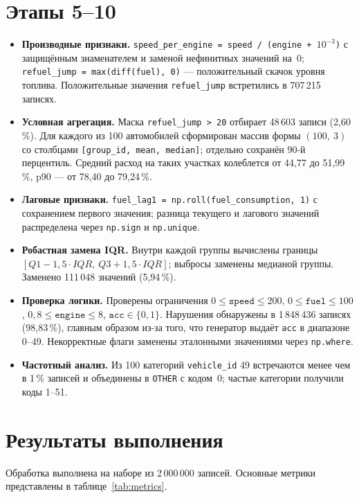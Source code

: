 \documentclass[oneside,a4paper,14pt]{extarticle}
\begin{document}
\section*{Этапы 5--10}
\begin{itemize}[leftmargin=*]
	\item \textbf{Производные признаки.} \texttt{speed\_per\_engine = speed / (engine + $10^{-3}$)} с защищённым знаменателем и заменой нефинитных значений на~0; \texttt{refuel\_jump = max(diff(fuel), 0)} --- положительный скачок уровня топлива. Положительные значения \texttt{refuel\_jump} встретились в 707\,215 записях.
	\item \textbf{Условная агрегация.} Маска \texttt{refuel\_jump > 20} отбирает 48\,603 записи (2,60\,\%). Для каждого из 100 автомобилей сформирован массив формы $(100,\ 3)$ со столбцами \texttt{[group\_id, mean, median]}; отдельно сохранён 90-й перцентиль. Средний расход на таких участках колеблется от 44,77 до 51,99\,\%, p90 --- от 78,40 до 79,24\,\%.
	\item \textbf{Лаговые признаки.} \texttt{fuel\_lag1 = np.roll(fuel\_consumption, 1)} с сохранением первого значения; разница текущего и лагового значений распределена через \texttt{np.sign} и \texttt{np.unique}.
	\item \textbf{Робастная замена IQR.} Внутри каждой группы вычислены границы $[Q1 - 1{,}5 \cdot IQR,\ Q3 + 1{,}5 \cdot IQR]$; выбросы заменены медианой группы. Заменено 111\,048 значений (5,94\,\%).
	\item \textbf{Проверка логики.} Проверены ограничения $0 \le \texttt{speed} \le 200$, $0 \le \texttt{fuel} \le 100$, $0{,}8 \le \texttt{engine} \le 8$, $\texttt{acc} \in \{0,1\}$. Нарушения обнаружены в 1\,848\,436 записях (98,83\,\%), главным образом из-за того, что генератор выдаёт \texttt{acc} в диапазоне 0--49. Некорректные флаги заменены эталонными значениями через \texttt{np.where}.
	\item \textbf{Частотный анализ.} Из 100 категорий \texttt{vehicle\_id} 49 встречаются менее чем в 1\,\% записей и объединены в \texttt{OTHER} с кодом~0; частые категории получили коды 1--51.
\end{itemize}

\section*{Результаты выполнения}
Обработка выполнена на наборе из 2\,000\,000 записей. Основные метрики представлены в таблице~\ref{tab:metrics}.
\end{document}
